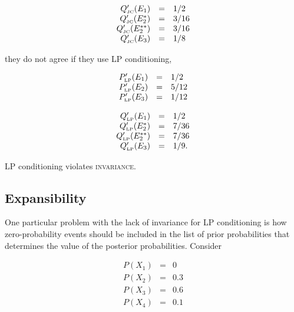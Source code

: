 \documentclass[smallextended]{svjour3}       %
\begin{document}
\begin{equation}
  \label{eq:marpleposteriorjc}
  \begin{array}{rcl}
  Q'_{\mbox{\tiny JC}}(E_{1})&=&1/2\\
  Q'_{\mbox{\tiny JC}}(E_{2}^{*})&=&3/16\\
  Q'_{\mbox{\tiny JC}}(E_{2}^{**})&=&3/16\\
  Q'_{\mbox{\tiny JC}}(E_{3})&=&1/8
\end{array}
\end{equation}

they do not agree if they use LP conditioning,

\begin{equation}
  \label{eq:sherlockposteriorlp}
  \begin{array}{rcl}
  P'_{\mbox{\tiny LP}}(E_{1})&=&1/2\\
  P'_{\mbox{\tiny LP}}(E_{2})&=&5/12\\
  P'_{\mbox{\tiny LP}}(E_{3})&=&1/12
\end{array}
\end{equation}

\begin{equation}
  \label{eq:marpleposteriorlp}
  \begin{array}{rcl}
  Q'_{\mbox{\tiny LP}}(E_{1})&=&1/2\\
  Q'_{\mbox{\tiny LP}}(E_{2}^{*})&=&7/36\\
  Q'_{\mbox{\tiny LP}}(E_{2}^{**})&=&7/36\\
  Q'_{\mbox{\tiny LP}}(E_{3})&=&1/9.
\end{array}
\end{equation}

LP conditioning violates \textsc{invariance}.

\subsection{Expansibility}
\label{Expansibility}

One particular problem with the lack of invariance for LP conditioning
is how zero-probability events should be included in the list of prior
probabilities that determines the value of the posterior
probabilities. Consider

\begin{equation}
  \label{eq:reginvone}
  \begin{array}{rcl}
  P(X_{1})&=&0\\
  P(X_{2})&=&0.3\\
  P(X_{3})&=&0.6\\
  P(X_{4})&=&0.1\\
\end{array}
\end{equation}
\end{document}
